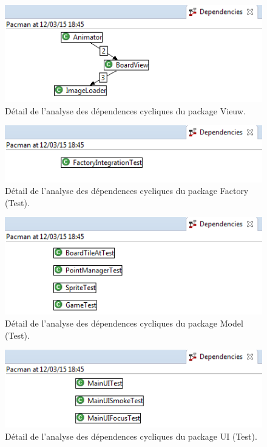 \documentclass[12pt,a4paper,final]{article}
\begin{document}
\begin{figure}[ht]
	\centering
	\includegraphics[width=\textwidth]{images/DependenciesVieuw.png}
	\caption{\label{dependenciesV}Détail de l'analyse des dépendences cycliques du package Vieuw.}
\end{figure}

\begin{figure}[ht]
	\centering
	\includegraphics[width=\textwidth]{images/DependenciesFactoryTest.png}
	\caption{\label{dependenciesFT}Détail de l'analyse des dépendences cycliques du package Factory (Test).}
\end{figure}

\begin{figure}[ht]
	\centering
	\includegraphics[width=\textwidth]{images/DependenciesModelTest.png}
	\caption{\label{dependenciesMT}Détail de l'analyse des dépendences cycliques du package Model (Test).}
\end{figure}

\begin{figure}[ht]
	\centering
	\includegraphics[width=\textwidth]{images/DependenciesUITest.png}
	\caption{\label{dependenciesUIT}Détail de l'analyse des dépendences cycliques du package UI (Test).}
\end{figure}
\end{document}
